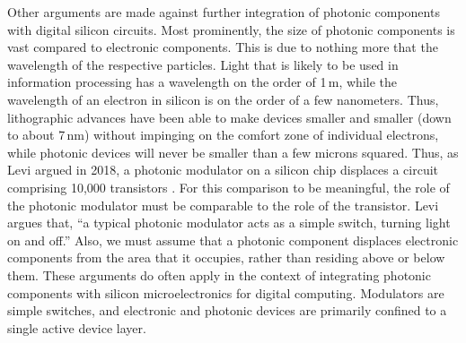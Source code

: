 Other arguments are made against further integration of photonic components with digital silicon circuits. Most prominently, the size of photonic components is vast compared to electronic components. This is due to nothing more that the wavelength of the respective particles. Light that is likely to be used in information processing has a wavelength on the order of 1\,\textmu m, while the wavelength of an electron in silicon is on the order of a few nanometers. Thus, lithographic advances have been able to make devices smaller and smaller (down to about 7\,nm) without impinging on the comfort zone of individual electrons, while photonic devices will never be smaller than a few microns squared. Thus, as Levi argued in 2018, a photonic modulator on a silicon chip displaces a circuit comprising 10,000 transistors \cite{le2018}. For this comparison to be meaningful, the role of the photonic modulator must be comparable to the role of the transistor. Levi argues that, ``a typical photonic modulator acts as a simple switch, turning light on and off.'' Also, we must assume that a photonic component displaces electronic components from the area that it occupies, rather than residing above or below them. These arguments do often apply in the context of integrating photonic components with silicon microelectronics for digital computing. Modulators are simple switches, and electronic and photonic devices are primarily confined to a single active device layer. 

